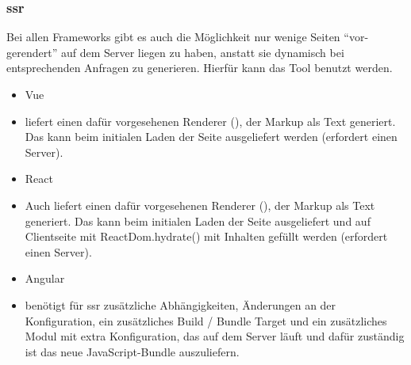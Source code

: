 \subsubsection{\acrlong{ssr}}
Bei allen Frameworks gibt es auch die Möglichkeit nur wenige Seiten ``vor-gerendert'' auf dem Server liegen zu haben, anstatt sie dynamisch bei entsprechenden Anfragen zu generieren. Hierfür kann das  Tool  benutzt werden.
\begin{itemize}
    \item{Vue}
    \item[]  liefert einen dafür vorgesehenen Renderer (), der Markup als Text generiert. Das kann beim initialen Laden der Seite ausgeliefert werden (erfordert einen  Server).
    \item{React}
    \item[] Auch  liefert einen dafür vorgesehenen Renderer (), der Markup als Text generiert. Das kann beim initialen Laden der Seite ausgeliefert und auf Clientseite mit ReactDom.hydrate() mit Inhalten gefüllt werden (erfordert einen  Server).
    \item{Angular}
    \item[]  benötigt für \gls{ssr} zusätzliche Abhängigkeiten, Änderungen an der Konfiguration, ein zusätzliches Build / Bundle Target und ein zusätzliches Modul mit extra Konfiguration, das auf dem Server läuft und dafür zuständig ist das neue JavaScript-Bundle auszuliefern.
\end{itemize}

